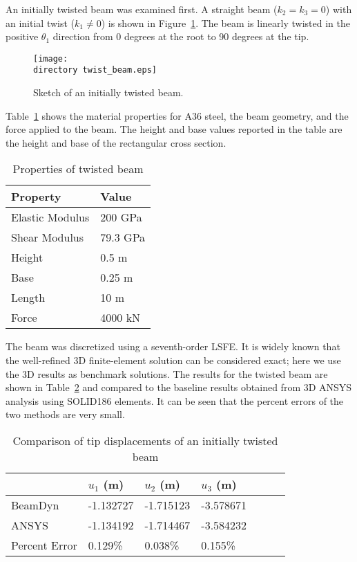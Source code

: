 \documentclass{aiaa-tc}
\def\directory{EPSF/}
\begin{document}
An initially twisted beam was examined first. A straight beam ($k_2=k_3=0$) with an initial twist ($k_1\neq 0$) is shown in Figure~\ref{Twist1}. The beam is linearly twisted in the positive $\theta_1$ direction from 0 degrees at the root to 90 degrees at the tip.
\begin{figure}
\centering
\texttt{[image: \\directory twist\_beam.eps]}
\caption{Sketch of an initially twisted beam.} 
\label{Twist1}
\end{figure}
 Table~\ref{E1Property} shows the material properties for A36 steel, the beam geometry, and the force applied to the beam. The height and base values reported in the table are the height and base of the rectangular cross section. 
 \begin{table}
\caption{\label{E1Property} Properties of twisted beam}
\begin{center}
    \begin{tabular}{| l | l |}
    	\hline
    	Property               & Value   \\ \hline
    	Elastic Modulus                      & 200 GPa \\ \hline
    	Shear Modulus                      & 79.3 GPa \\ \hline
    	Height                      & 0.5 m   \\ \hline
    	Base                      & 0.25 m  \\ \hline
    	Length                      & 10 m    \\ \hline
    	Force                      & 4000 kN \\ \hline
    \end{tabular}
\end{center}
\end{table}
The beam was discretized using a seventh-order LSFE. It is widely known that the well-refined 3D finite-element solution can be considered exact; here we use the 3D results as benchmark solutions. The results for the twisted beam are shown in Table~\ref{E1u} and compared to the baseline results obtained from 3D ANSYS analysis using SOLID186 elements. It can be seen that the percent errors of the two methods are very small.
\begin{table}
\caption{\label{E1u} Comparison of tip displacements of an initially twisted beam} 
\begin{center} 
    \begin{tabular}{| l | l | l | l | l | l | l |}
    	\hline
    	        & $u_1$ (m) & $u_2$ (m) & $u_3$ (m)  \\ \hline
    	BeamDyn  & -1.132727     & -1.715123       & -3.578671      \\  \hline
    	ANSYS   & -1.134192     & -1.714467      & -3.584232     \\ \hline
    	Percent Error   & 0.129\%     & 0.038\%      & 0.155\%     \\ \hline
    \end{tabular}
\end{center}
\end{table} 
\end{document}
